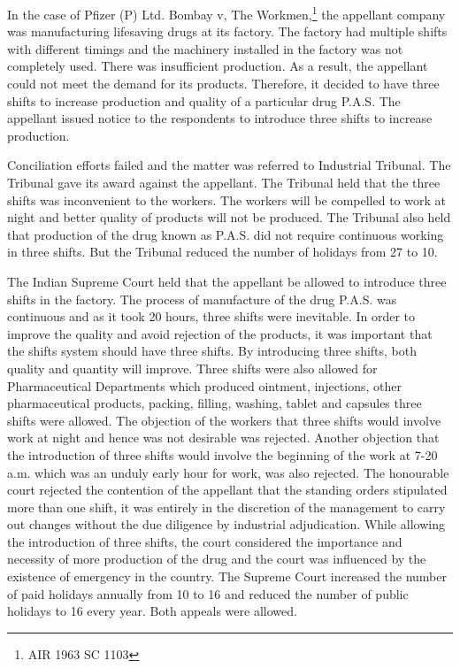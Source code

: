 \begin{multicols}{2}
\vspace{-.1cm}

\noi
In the case of Pfizer (P) Ltd. Bombay v, The Workmen,\footnote{AIR 1963 SC 1103} the appellant company was
manufacturing lifesaving drugs at its factory. The factory had multiple shifts with different
timings and the machinery installed in the factory was not completely used. There was
insufficient production. As a result, the appellant could not meet the demand for its products.
Therefore, it decided to have three shifts to increase production and quality of a particular 
drug P.A.S. The appellant issued notice to the respondents to introduce three shifts to
increase production.

\vspace{-.1cm}

\noi
Conciliation efforts failed and the matter was referred to Industrial Tribunal. The Tribunal
gave its award against the appellant. The Tribunal held that the three shifts was inconvenient
to the workers. The workers will be compelled to work at night and better quality of products
will not be produced. The Tribunal also held that production of the drug known as P.A.S. did
not require continuous working in three shifts. But the Tribunal reduced the number of
holidays from 27 to 10.

\vspace{-.1cm}

\noi
The Indian Supreme Court held that the appellant be allowed to introduce three shifts in the
factory. The process of manufacture of the drug P.A.S. was continuous and as it took 20
hours, three shifts were inevitable. In order to improve the quality and avoid rejection of the
products, it was important that the shifts system should have three shifts. By introducing three
shifts, both quality and quantity will improve. Three shifts were also allowed for
Pharmaceutical Departments which produced ointment, injections, other pharmaceutical
products, packing, filling, washing, tablet and capsules three shifts were allowed. The
objection of the workers that three shifts would involve work at night and hence was not
desirable was rejected. Another objection that the introduction of three shifts would involve
the beginning of the work at 7-20 a.m. which was an unduly early hour for work, was also
rejected. The honourable court rejected the contention of the appellant that the standing
orders stipulated more than one shift, it was entirely in the discretion of the management to
carry out changes without the due diligence by industrial adjudication. While allowing the
introduction of three shifts, the court considered the importance and necessity of more
production of the drug and the court was influenced by the existence of emergency in the
country. The Supreme Court increased the number of paid holidays annually from 10 to 16
and reduced the number of public holidays to 16 every year. Both appeals were allowed.


\end{multicols}
